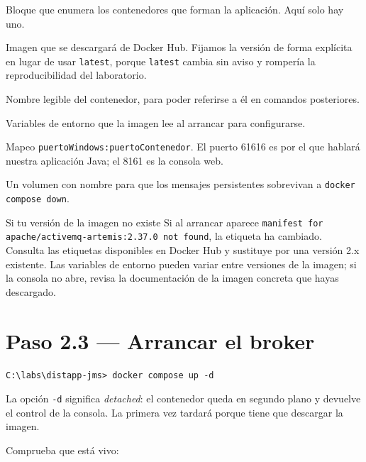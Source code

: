 \documentclass[11pt,a4paper]{book}
\begin{document}
\begin{description}[leftmargin=1.6em,style=nextline,itemsep=3pt]
	\item[\texttt{services:}] Bloque que enumera los contenedores que forman la aplicación. Aquí solo hay uno.
	\item[\texttt{image:}] Imagen que se descargará de Docker Hub. Fijamos la versión de forma explícita en lugar de usar \texttt{latest}, porque \texttt{latest} cambia sin aviso y rompería la reproducibilidad del laboratorio.
	\item[\texttt{container\_name:}] Nombre legible del contenedor, para poder referirse a él en comandos posteriores.
	\item[\texttt{environment:}] Variables de entorno que la imagen lee al arrancar para configurarse.
	\item[\texttt{ports:}] Mapeo \texttt{puertoWindows:puertoContenedor}. El puerto 61616 es por el que hablará nuestra aplicación Java; el 8161 es la consola web.
	\item[\texttt{volumes:}] Un volumen con nombre para que los mensajes persistentes sobrevivan a \texttt{docker compose down}.
\end{description}

\begin{cajaTip}{Si tu versión de la imagen no existe}
	Si al arrancar aparece \texttt{manifest for apache/activemq-artemis:2.37.0 not found}, la etiqueta ha cambiado.
	Consulta las etiquetas disponibles en Docker Hub y sustituye por una versión 2.x existente.
	Las variables de entorno pueden variar entre versiones de la imagen; si la consola no abre, revisa la documentación de la imagen concreta que hayas descargado.
\end{cajaTip}

\section{Paso 2.3 --- Arrancar el broker}

\begin{lstlisting}[language=consola,caption={Arranque del broker},label={lst:arranque}]
C:\labs\distapp-jms> docker compose up -d
\end{lstlisting}

La opción \texttt{-d} significa \emph{detached}: el contenedor queda en segundo plano y devuelve el control de la consola.
La primera vez tardará porque tiene que descargar la imagen.

Comprueba que está vivo:
\end{document}
